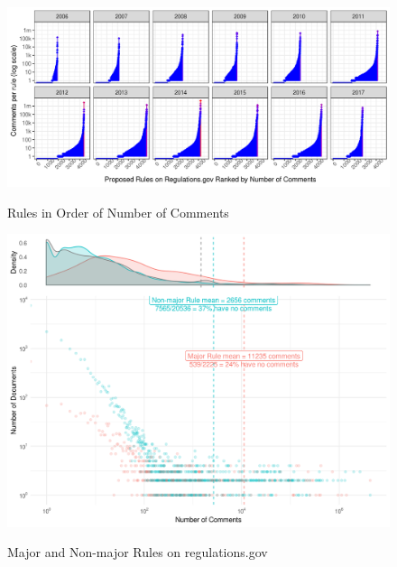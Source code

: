 \documentclass[
      12pt,
        ]{article}
\begin{document}
\begin{figure}[h!]
    \centering
        \caption{Rules in Order of Number of Comments}
    \includegraphics[width = 6.5in]{../Figs/rules-ranked-comments-per-year-1.png}
    \label{fig:rules-ranked}
\end{figure}

\begin{figure}[p!]
    \centering
        \caption{Major and Non-major Rules on regulations.gov}
    \includegraphics[width = 7in]{../Figs/major-comments-density-1.png}
    \label{fig:rules-major}
\end{figure}
\end{document}
